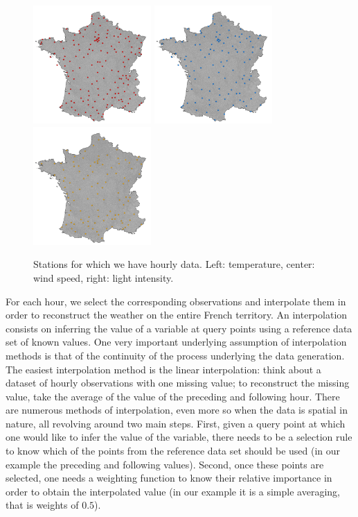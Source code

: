 \begin{figure}[!ht]
\begin{center} \includegraphics[height=45mm]{forqgis/stationstemp.pdf} \hspace{0.05cm}\includegraphics[height=45mm]{forqgis/stationswind.pdf}
\hspace{0.05cm}\includegraphics[height=45mm]{forqgis/stationslum.pdf}
 \end{center}
\caption{Stations for which we have hourly data. Left: temperature, center: wind speed, right: light intensity.}
\label{fig:stations}
\end{figure}

For each hour, we select the corresponding observations and interpolate them in order to reconstruct the weather on the entire French territory. An interpolation consists on inferring the value of a variable at query points using a reference data set of known values. One very important underlying assumption of interpolation methods is that of the continuity of the process underlying the data generation. The easiest interpolation method is the linear interpolation: think about a dataset of hourly observations with one missing value; to reconstruct the missing value, take the average of the value of the preceding and following hour. There are numerous methods of interpolation, even more so when the data is spatial in nature, all revolving around two main steps. First, given a query point at which one would like to infer the value of the variable, there needs to be a selection rule to know which of the points from the reference data set should be used (in our example the preceding and following values). Second, once these points are selected, one needs a weighting function to know their relative importance in order to obtain the interpolated value (in our example it is a simple averaging, that is weights of $0.5$). \\

